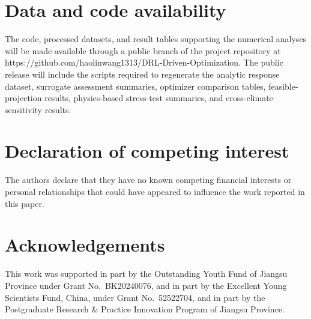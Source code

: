 \documentclass[final,3p,times,numbers,sort&compress]{elsarticle}
\def\href#1#2{#2}%
\def\textcolor#1#2{#2}%
\def\rev#1{#1}%
\newif\ifshowrevision
\newcommand{\rev}[1]{%
  \ifshowrevision{\textcolor{revisionblue}{#1}}\else#1\fi%
}
\begin{document}
\section*{Data and code availability}

\rev{The code, processed datasets, and result tables supporting the numerical analyses will be made available through a public branch of the project repository at \href{https://github.com/haolinwang1313/DRL-Driven-Optimization}{https://github.com/haolinwang1313/DRL-Driven-Optimization}. The public release will include the scripts required to regenerate the analytic response dataset, surrogate assessment summaries, optimizer comparison tables, feasible-projection results, physics-based stress-test summaries, and cross-climate sensitivity results.}

\section*{Declaration of competing interest}

The authors declare that they have no known competing financial interests or personal relationships that could have appeared to influence the work reported in this paper.

\section*{Acknowledgements}

This work was supported in part by the Outstanding Youth Fund of Jiangsu Province under Grant No.~BK20240076, and in part by the Excellent Young Scientists Fund, China, under Grant No.~52522704\rev{, and in part by the Postgraduate Research \& Practice Innovation Program of Jiangsu Province}.


\end{document}
